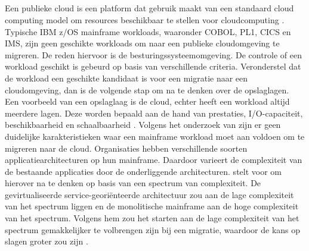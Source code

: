 \subsection{}
\label{sec:Welke workloads kunnen gemigreerd worden naar de cloud?}

Een publieke cloud is een platform dat gebruik maakt van een standaard cloud computing model om resources beschikbaar te stellen voor cloudcomputing \autocite{Allison2016}. Typische IBM z/OS mainframe workloads, waaronder COBOL, PL1, CICS en IMS, zijn geen geschikte workloads om naar een publieke cloudomgeving te migreren. De reden hiervoor is de besturingssysteemomgeving. De controle of een workload geschikt is gebeurd op basis van verschillende criteria. Veronderstel dat de workload een geschikte kandidaat is voor een migratie naar een cloudomgeving, dan is de volgende stap om na te denken over de opslaglagen. Een voorbeeld van een opslaglaag is de cloud, echter heeft een workload altijd meerdere lagen. Deze worden bepaald aan de hand van prestaties, I/O-capaciteit, beschikbaarheid en schaalbaarheid \autocite{Allison2016}. Volgens het onderzoek van \textcite{Martikainen2018} zijn er geen duidelijke karakteristieken waar een mainframe workload moet aan voldoen om te migreren naar de cloud. Organisaties hebben verschillende soorten applicatiearchitecturen op hun mainframe. Daardoor varieert de complexiteit van de bestaande applicaties door de onderliggende architecturen. \textcite{Orban2016} stelt voor om hierover na te denken op basis van een spectrum van complexiteit. De gevirtualiseerde service-georiënteerde architectuur zou aan de lage complexiteit van het spectrum liggen en de monolitische mainframe aan de hoge complexiteit van het spectrum. Volgens hem zou het starten aan de lage complexiteit van het spectrum gemakkelijker te volbrengen zijn bij een migratie, waardoor de kans op slagen groter zou zijn \autocite{Orban2016}. 


